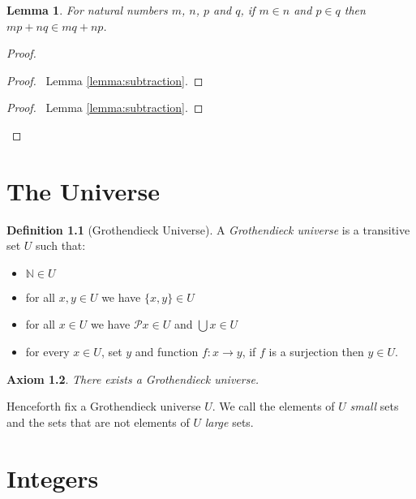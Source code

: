 \documentclass{report}
\newtheorem{axiom}{Axiom}[section]
\newtheorem{lemma}[axiom]{Lemma}
\theoremstyle{definition}
\newtheorem{definition}[axiom]{Definition}
\begin{document}
    \begin{lemma}
        \label{lemma:pre_integer_ordering}
        For natural numbers $m$, $n$, $p$ and $q$, if $m \in n$ and $p \in q$
        then $mp + nq \in mq + np$.
    \end{lemma}

    \begin{proof}
        \begin{proof}
            \pf\ Lemma \ref{lemma:subtraction}.
        \end{proof}
        \begin{proof}
            \pf\ Lemma \ref{lemma:subtraction}.
        \end{proof}
    \end{proof}

    \chapter{The Universe}

    \begin{definition}[Grothendieck Universe]
        A \emph{Grothendieck universe} is a transitive set $U$ such that:
        \begin{itemize}
            \item $\mathbb{N} \in U$
            \item for all $x,y \in U$ we have $\{x,y\} \in U$
            \item for all $x \in U$ we have $\mathcal{P} x \in U$ and
            $\bigcup x \in U$
            \item for every $x \in U$, set $y$ and function $f : x \rightarrow y$,
            if $f$ is a surjection then $y \in U$.
        \end{itemize}
    \end{definition}

    \begin{axiom}
        There exists a Grothendieck universe.
    \end{axiom}

    Henceforth fix a Grothendieck universe $U$. We call the elements of $U$ \emph{small}
    sets and the sets that are not elements of $U$ \emph{large} sets.
    
    \chapter{Integers}
\end{document}
